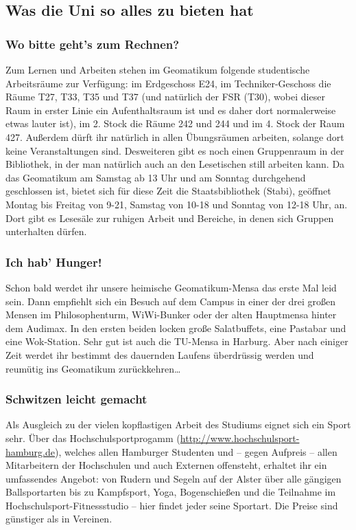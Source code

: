 \subsection{Was die Uni so alles zu bieten hat}

\subsubsection{Wo bitte geht's zum Rechnen?}

Zum Lernen und Arbeiten stehen im Geomatikum folgende studentische Arbeitsräume
zur Verfügung: im Erdgeschoss E24, im Techniker-Geschoss die Räume T27, T33,
T35 und T37 (und natürlich der FSR (T30), wobei dieser Raum in erster Linie ein
Aufenthaltsraum ist und es daher dort normalerweise etwas lauter ist), im 2.
Stock die Räume 242 und 244 und im 4. Stock der Raum 427. Außerdem dürft ihr
natürlich in allen Übungsräumen arbeiten, solange dort keine Veranstaltungen
sind. Desweiteren gibt es noch einen Gruppenraum in der Bibliothek, in der man
natürlich auch an den Lesetischen still arbeiten kann. Da das Geomatikum am
Samstag ab 13 Uhr und am Sonntag durchgehend geschlossen ist, bietet sich für
diese Zeit die Staatsbibliothek (Stabi), geöffnet Montag bis Freitag von 9-21,
Samstag von 10-18 und Sonntag von 12-18 Uhr, an. Dort gibt es Lesesäle zur
ruhigen Arbeit und Bereiche, in denen sich Gruppen unterhalten dürfen.

\subsubsection{Ich hab' Hunger!}

Schon bald werdet ihr unsere heimische Geomatikum-Mensa das erste Mal leid
sein. Dann empfiehlt sich ein Besuch auf dem Campus in einer der drei großen
Mensen im Philosophenturm, WiWi-Bunker oder der alten Hauptmensa hinter dem
Audimax. In den ersten beiden locken große Salatbuffets, eine Pastabar und eine
Wok-Station. Sehr gut ist auch die TU-Mensa in Harburg. Aber nach einiger Zeit
werdet ihr bestimmt des dauernden Laufens überdrüssig werden und reumütig ins
Geomatikum zurückkehren\ldots

\subsubsection{Schwitzen leicht gemacht}

Als Ausgleich zu der vielen kopflastigen Arbeit des Studiums eignet sich ein
Sport sehr. Über das Hochschulsportprogamm
(\url{http://www.hochschulsport-hamburg.de}), welches allen Hamburger Studenten
und -- gegen Aufpreis -- allen Mitarbeitern der Hochschulen und auch Externen
offensteht, erhaltet ihr ein umfassendes Angebot: von Rudern und Segeln auf der
Alster über alle gängigen Ballsportarten bis zu Kampfsport, Yoga, Bogenschießen
und die Teilnahme im Hochschulsport-Fitnessstudio -- hier findet jeder seine
Sportart.  Die Preise sind günstiger als in Vereinen.

